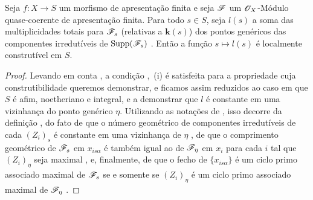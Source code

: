 \begin{proposition}[9.8.8]
\label{IV.9.8.8}
Seja $f:X\to S$ um morfismo de apresentação finita e seja $\mathscr{F}$ um $\mathscr{O}_X$-Módulo quase-coerente de apresentação finita.
Para todo $s\in S$, seja $l(s)$ a soma das multiplicidades totais para $\mathscr{F}_s$ (relativas a $\mathbf{k}(s)$) dos pontos genéricos das componentes irredutíveis de $\operatorname{Supp}(\mathscr{F}_s)$ .
Então a função $s\mapsto l(s)$ é localmente construtível em $S$.
\end{proposition}

\begin{proof}
\label{IV.9.8.8-proof}
Levando em conta , a condição ,~(i) é satisfeita para a propriedade cuja construtibilidade queremos demonstrar, e ficamos assim reduzidos ao caso em que $S$ é afim, noetheriano e integral, e a demonstrar que $l$ é constante em uma vizinhança do ponto genérico $\eta$.
Utilizando as notações de , isso decorre da definição , do fato de que o número geométrico de componentes irredutíveis de cada $(Z_i)_s$ é constante em uma vizinhança de $\eta$ , de que o comprimento geométrico de $\mathscr{F}_s$ em $x_{is\alpha}$ é também igual ao de $\mathscr{F}_\eta$ em $x_i$ para cada $i$ tal que $(Z_i)_\eta$ seja maximal , e, finalmente, de que o fecho de $\{x_{is\alpha}\}$ é um ciclo primo associado maximal de $\mathscr{F}_s$ se e somente se $(Z_i)_\eta$ é um ciclo primo associado maximal de $\mathscr{F}_\eta$ .
\end{proof}

